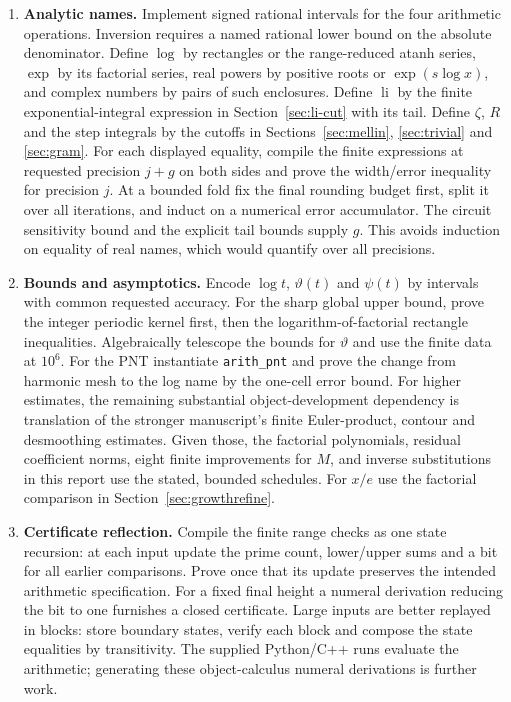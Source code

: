\begin{enumerate}
\item \textbf{Analytic names.} Implement signed rational intervals for the four arithmetic operations. Inversion requires a named rational lower bound on the absolute denominator. Define $\log$ by rectangles or the range-reduced atanh series, $\exp$ by its factorial series, real powers by positive roots or $\exp(s\log x)$, and complex numbers by pairs of such enclosures. Define $\operatorname{li}$ by the finite exponential-integral expression in Section~\ref{sec:li-cut} with its tail. Define $\zeta$, $R$ and the step integrals by the cutoffs in Sections~\ref{sec:mellin}, \ref{sec:trivial} and \ref{sec:gram}. For each displayed equality, compile the finite expressions at requested precision $j+g$ on both sides and prove the width/error inequality for precision $j$. At a bounded fold fix the final rounding budget first, split it over all iterations, and induct on a numerical error accumulator. The circuit sensitivity bound and the explicit tail bounds supply $g$. This avoids induction on equality of real names, which would quantify over all precisions.
\item \textbf{Bounds and asymptotics.} Encode $\log t$, $\vartheta(t)$ and $\psi(t)$ by intervals with common requested accuracy. For the sharp global upper bound, prove the integer periodic kernel first, then the logarithm-of-factorial rectangle inequalities. Algebraically telescope the bounds for $\vartheta$ and use the finite data at $10^6$. For the PNT instantiate \texttt{arith\_pnt} and prove the change from harmonic mesh to the log name by the one-cell error bound. For higher estimates, the remaining substantial object-development dependency is translation of the stronger manuscript's finite Euler-product, contour and desmoothing estimates. Given those, the factorial polynomials, residual coefficient norms, eight finite improvements for $M$, and inverse substitutions in this report use the stated, bounded schedules. For $x/e$ use the factorial comparison in Section~\ref{sec:growthrefine}.
\item \textbf{Certificate reflection.} Compile the finite range checks as one state recursion: at each input update the prime count, lower/upper sums and a bit for all earlier comparisons. Prove once that its update preserves the intended arithmetic specification. For a fixed final height a numeral derivation reducing the bit to one furnishes a closed certificate. Large inputs are better replayed in blocks: store boundary states, verify each block and compose the state equalities by transitivity. The supplied Python/C++ runs evaluate the arithmetic; generating these object-calculus numeral derivations is further work.
\end{enumerate}

